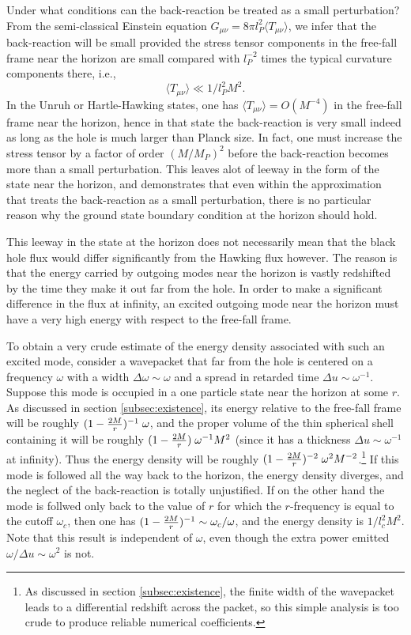 \documentclass[12pt]{article}
\def\o{\omega}
\def\la{\langle}
\def\ra{\rangle}
\begin{document}
Under what conditions can the back-reaction be treated
as a small perturbation? From the semi-classical
Einstein equation $G_{\mu\nu}=8\pi l_P^2 \la
T_{\mu\nu}\ra$, we infer that the back-reaction will
be small provided the stress tensor components
in the free-fall frame near the horizon are small
compared with $l_P^{-2}$ times the typical curvature
components there, i.e.,
\begin{equation}
\la T_{\mu\nu}\ra\ll 1/l_P^2 M^2.
\label{inequality}
\end{equation}
In the Unruh or Hartle-Hawking states, one has $\la
T_{\mu\nu}\ra=O(M^{-4})$ in the free-fall frame near the
horizon, hence in that state the back-reaction is very small indeed
as long as the hole is much larger than Planck size.
In fact, one must increase the stress tensor by a
factor of order $(M/M_P)^2$ before the back-reaction
becomes more than a small perturbation. This leaves
alot of leeway in the form of the state near the
horizon, and demonstrates that even within the
approximation that treats the back-reaction as a small
perturbation, there is no particular reason why the
ground state boundary condition at the horizon should
hold.

This leeway in the state at the horizon does not
necessarily mean that the black hole flux
would differ significantly from the Hawking flux
however. The
reason is that the energy carried by outgoing modes
near the horizon is vastly redshifted by the time they
make it out far from the hole. In order to make a
significant difference in the flux at infinity, an
excited outgoing mode near the horizon must have a very
high energy with respect to the free-fall frame.

To obtain a very crude estimate of the energy density
associated with such an excited mode, consider a wavepacket
that far from the hole is centered on a frequency $\o$
with a width $\Delta\o\sim\o$ and a spread in
retarded time $\Delta u\sim\o^{-1}$.
Suppose this mode is occupied in a one
particle state near the
horizon at some $r$. As discussed in section
\ref{subsec:existence},
its energy relative to the free-fall frame
will be roughly $(1-{2M\over r})^{-1}\; \o$, and the
proper volume of the thin spherical shell containing it will
be roughly $(1-{2M\over r})\; \o^{-1}M^2$ (since it has a thickness
$\Delta u\sim \o^{-1}$ at infinity).
Thus the energy density will be
roughly $(1-{2M\over r})^{-2}\; \o^2 M^{-2}$.\footnote{As discussed
in section \ref{subsec:existence}, the finite width of the
wavepacket leads to a differential redshift across the
packet, so this simple analysis is too crude to produce
reliable numerical coefficients.}
If this mode is followed all the way back to the
horizon, the energy density diverges, and the neglect
of the back-reaction is totally unjustified. If on the
other hand the mode is follwed only back to the value
of $r$ for which the $r$-frequency is equal to the cutoff
$\o_c$, then one has $(1-{2M\over r})^{-1}\sim \o_c/\o$,
and the energy density is $1/l_c^2M^2$.
Note that this result is
independent of $\o$, even though the extra power emitted
$\o/\Delta u\sim\o^2$ is not.
\end{document}

